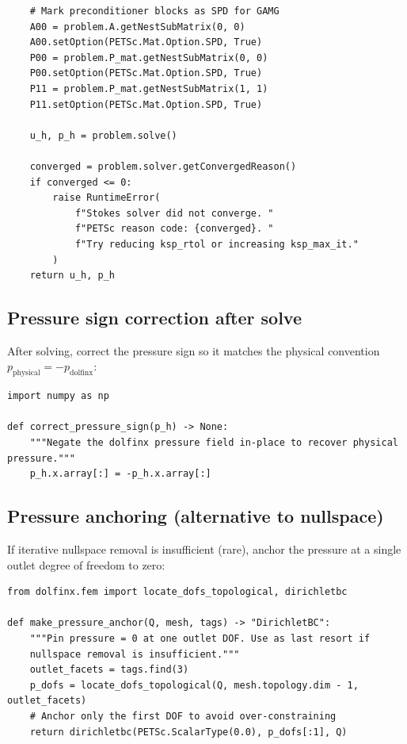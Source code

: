 \documentclass[11pt]{article}
\begin{document}
\begin{lstlisting}
    # Mark preconditioner blocks as SPD for GAMG
    A00 = problem.A.getNestSubMatrix(0, 0)
    A00.setOption(PETSc.Mat.Option.SPD, True)
    P00 = problem.P_mat.getNestSubMatrix(0, 0)
    P00.setOption(PETSc.Mat.Option.SPD, True)
    P11 = problem.P_mat.getNestSubMatrix(1, 1)
    P11.setOption(PETSc.Mat.Option.SPD, True)

    u_h, p_h = problem.solve()

    converged = problem.solver.getConvergedReason()
    if converged <= 0:
        raise RuntimeError(
            f"Stokes solver did not converge. "
            f"PETSc reason code: {converged}. "
            f"Try reducing ksp_rtol or increasing ksp_max_it."
        )
    return u_h, p_h
\end{lstlisting}

\subsection*{Pressure sign correction after solve}

After solving, correct the pressure sign so it matches the physical
convention $p_{\text{physical}} = -p_{\text{dolfinx}}$:

\begin{lstlisting}
import numpy as np

def correct_pressure_sign(p_h) -> None:
    """Negate the dolfinx pressure field in-place to recover physical pressure."""
    p_h.x.array[:] = -p_h.x.array[:]
\end{lstlisting}

\subsection*{Pressure anchoring (alternative to nullspace)}

If iterative nullspace removal is insufficient (rare), anchor the pressure
at a single outlet degree of freedom to zero:

\begin{lstlisting}
from dolfinx.fem import locate_dofs_topological, dirichletbc

def make_pressure_anchor(Q, mesh, tags) -> "DirichletBC":
    """Pin pressure = 0 at one outlet DOF. Use as last resort if
    nullspace removal is insufficient."""
    outlet_facets = tags.find(3)
    p_dofs = locate_dofs_topological(Q, mesh.topology.dim - 1, outlet_facets)
    # Anchor only the first DOF to avoid over-constraining
    return dirichletbc(PETSc.ScalarType(0.0), p_dofs[:1], Q)
\end{lstlisting}
\end{document}
